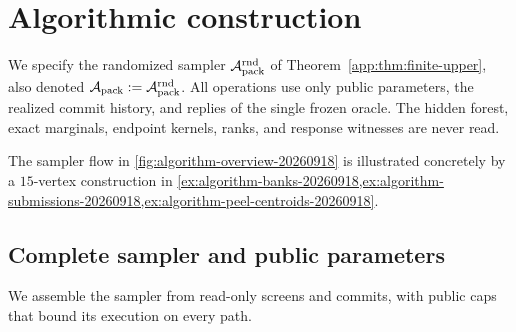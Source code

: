 \section{Algorithmic construction}
\label{app:algorithm}

We specify the randomized sampler $\mathcal A_{\mathrm{pack}}^{\mathrm{rnd}}$ of
Theorem~\ref{app:thm:finite-upper}, also denoted
$\mathcal A_{\mathrm{pack}}:=\mathcal A_{\mathrm{pack}}^{\mathrm{rnd}}$.
All operations use only public parameters, the realized commit history, and
replies of the single frozen oracle.  The hidden forest, exact marginals,
endpoint kernels, ranks, and response witnesses are never read.

The sampler flow in \cref{fig:algorithm-overview-20260918} is illustrated
concretely by a $15$-vertex construction in
\cref{ex:algorithm-banks-20260918,ex:algorithm-submissions-20260918,ex:algorithm-peel-centroids-20260918}.

\subsection{Complete sampler and public parameters}
\label{app:algorithm-overview}
\label{app:algorithm-complete-sampler}

We assemble the sampler from read-only screens and commits, with public
caps that bound its execution on every path.

